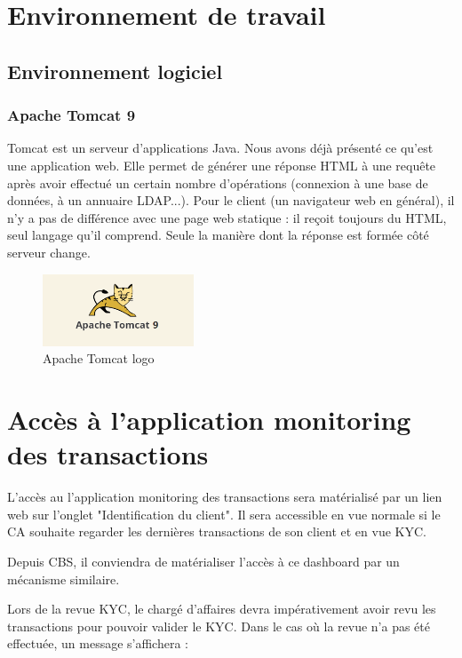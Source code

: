 \section{Environnement de travail}
\subsection{Environnement logiciel}
\subsubsection*{Apache Tomcat 9}
Tomcat est un serveur d'applications Java. Nous avons déjà présenté ce qu'est une application web. Elle permet de générer une réponse HTML à une requête après avoir effectué un certain nombre d'opérations (connexion à une base de données, à un annuaire LDAP...). Pour le client (un navigateur web en général), il n'y a pas de différence avec une page web statique : il reçoit toujours du HTML, seul langage qu'il comprend. Seule la manière dont la réponse est formée côté serveur change.
\begin{figure}[!ht]\centering
\includegraphics[width=0.4\textwidth]{chapitres/chapitre8/figures/apachtomcat.png}
\caption{Apache Tomcat logo}
\label{fig:apachtomcat}
\end{figure}
\section{Accès à l'application monitoring des transactions }	
L'accès au l'application monitoring des transactions sera matérialisé par un lien web sur l'onglet "Identification du client". Il sera accessible en vue normale si le CA souhaite regarder les dernières transactions de son client et en vue KYC.

Depuis CBS, il conviendra de matérialiser l’accès à ce dashboard par un mécanisme similaire.

Lors de la revue KYC, le chargé d'affaires devra impérativement avoir revu les transactions pour pouvoir valider le KYC. Dans le cas où la revue n'a pas été effectuée, un message s'affichera : 

